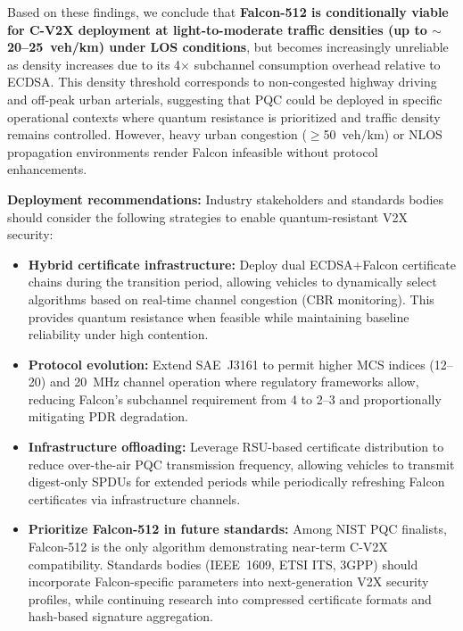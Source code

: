 \documentclass[letterpaper,journal]{IEEEtran}
\begin{document}
Based on these findings, we conclude that \textbf{Falcon-512 is conditionally viable for C-V2X deployment at light-to-moderate traffic densities (up to $\sim$20--25~veh/km) under LOS conditions}, but becomes increasingly unreliable as density increases due to its 4$\times$ subchannel consumption overhead relative to ECDSA. This density threshold corresponds to non-congested highway driving and off-peak urban arterials, suggesting that PQC could be deployed in specific operational contexts where quantum resistance is prioritized and traffic density remains controlled. However, heavy urban congestion ($\geq$50~veh/km) or NLOS propagation environments render Falcon infeasible without protocol enhancements.

\textbf{Deployment recommendations:} Industry stakeholders and standards bodies should consider the following strategies to enable quantum-resistant V2X security:
\begin{itemize}
    \item \textbf{Hybrid certificate infrastructure:} Deploy dual ECDSA+Falcon certificate chains during the transition period, allowing vehicles to dynamically select algorithms based on real-time channel congestion (CBR monitoring). This provides quantum resistance when feasible while maintaining baseline reliability under high contention.
    \item \textbf{Protocol evolution:} Extend SAE~J3161 to permit higher MCS indices (12--20) and 20~MHz channel operation where regulatory frameworks allow, reducing Falcon's subchannel requirement from 4 to 2--3 and proportionally mitigating PDR degradation.
    \item \textbf{Infrastructure offloading:} Leverage RSU-based certificate distribution to reduce over-the-air PQC transmission frequency, allowing vehicles to transmit digest-only SPDUs for extended periods while periodically refreshing Falcon certificates via infrastructure channels.
    \item \textbf{Prioritize Falcon-512 in future standards:} Among NIST PQC finalists, Falcon-512 is the only algorithm demonstrating near-term C-V2X compatibility. Standards bodies (IEEE~1609, ETSI ITS, 3GPP) should incorporate Falcon-specific parameters into next-generation V2X security profiles, while continuing research into compressed certificate formats and hash-based signature aggregation.
\end{itemize}
\end{document}
